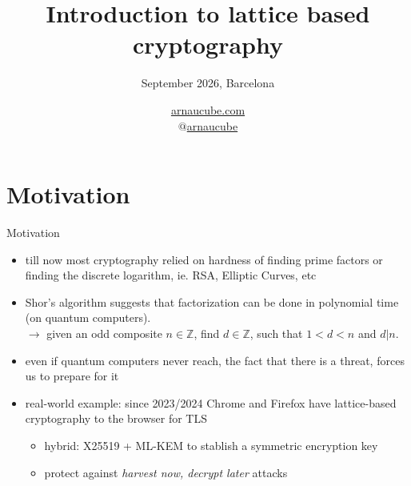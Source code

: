 \documentclass{beamer}
\title{Introduction to lattice based cryptography}
\author{
\scriptsize{September 2026, Barcelona}
}
\date{
  \scriptsize{
  \href{https://arnaucube.com}{arnaucube.com}\\
  \href{https://x.com/arnaucube}{$@$arnaucube}
}
}
\theoremstyle{customstyle}
\newcommand{\Zz}{\mathbb{Z}}
\begin{document}
\frame{\titlepage}



\section[Motivation]{Motivation}



\begin{frame}{Motivation}
  \begin{itemize}
    \item till now most cryptography relied on hardness of finding prime factors or finding the discrete logarithm, ie. RSA, Elliptic Curves, etc
    \item Shor's algorithm suggests that factorization can be done in polynomial time (on quantum computers).\\
      \small{
	$\rightarrow$ given an odd composite $n \in \Zz$, find $d \in \Zz$, such that $1< d <n$ and $d|n$.
      }
    \item even if quantum computers never reach, the fact that there is a threat, forces us to prepare for it
    \item real-world example: since 2023/2024 Chrome and Firefox have lattice-based cryptography to the browser for TLS
    \begin{itemize}
      \item hybrid: X25519 + ML-KEM to stablish a symmetric encryption key
      \item protect against \emph{harvest now, decrypt later} attacks
    \end{itemize}
  \end{itemize}
\end{frame}
\end{document}
